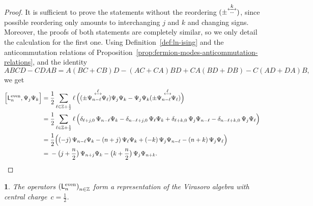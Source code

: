 \documentclass[12pt,oneside,english]{amsart}
\numberwithin{equation}{section}
\numberwithin{figure}{section}
\theoremstyle{plain}
\newtheorem{thm}{\protect\theoremname}
\theoremstyle{plain}
\theoremstyle{plain}
\theoremstyle{plain}
\theoremstyle{remark}
\theoremstyle{definition}
\theoremstyle{plain}
\theoremstyle{plain}
\numberwithin{thm}{section}
\providecommand{\theoremname}{Theorem}
\providecommand{\theoremname}{Theorem}
\providecommand{\theoremname}{Theorem}
\providecommand{\theoremname}{Theorem}
\begin{document}
\begin{proof}
It is sufficient to prove the statements without the reordering
$\ourforder{\cdot}{\cdot}{k}$, since possible reordering only amounts to 
interchanging $j$ and $k$ and changing signs.
Moreover, the proofs of both statements are completely similar, so we only 
detail the calculation for the first one.
Using Definition~\ref{def:ln-ising} and the anticommutation relations
of Proposition~\ref{prop:fermion-modes-anticommutation-relations}, and the 
identity
\[ AB CD - CD AB = A (BC+CB) D - (AC+CA) B D + C A (BD+DB) - C (AD+DA) B , \]
we get
\begin{align*}
\Big[ \virL{n}^{\abbrEven}, \fermmode_{j} \fermmode_{k} \Big]
= \; & \frac{1}{2} \sum_{\ell\in\Z +\frac{1}{2}} 
	\ell \, \Big( \ourforder{\fermmode_{n-\ell}}{\fermmode_{\ell}}{\ell}
				\fermmode_{j} \fermmode_{k}
	    - \fermmode_{j} \fermmode_{k} 	    
			  \ourforder{\fermmode_{n-\ell}}{\fermmode_{\ell}}{\ell} \Big) \\
= \; & \frac{1}{2} \sum_{\ell\in\Z +\frac{1}{2}} 
	\ell \, \Big( \delta_{\ell+j,0} \, \fermmode_{n - \ell} \fermmode_{k} 
	    - \delta_{n-\ell+j,0} \, \fermmode_{\ell} \fermmode_{k}
	    + \delta_{\ell+k,0} \, \fermmode_{j} \fermmode_{n - \ell} 
	    - \delta_{n-\ell+k,0} \, \fermmode_{j} \fermmode_{\ell} \Big) \\
= \; & \frac{1}{2} \Big(
		(-j) \, \fermmode_{n - \ell} \fermmode_{k} 
	    - (n+j) \, \fermmode_{\ell} \fermmode_{k}
	    + (-k) \, \fermmode_{j} \fermmode_{n - \ell} 
	    - (n+k) \, \fermmode_{j} \fermmode_{\ell} \Big) \\
= \; & - \big( j+\frac{n}{2} \big) \, \fermmode_{n+j}\fermmode_{k}
  - \big( k+\frac{n}{2} \big) \, \fermmode_{j}\fermmode_{n+k} .
\end{align*}
\end{proof}
\begin{thm}
\label{thm:ising-ns} The operators
$\left(\mathsf{L}_{n}^{\mathrm{even}}\right)_{n\in\mathbb{Z} }$
form a representation of the Virasoro algebra with central 
charge~${c=\frac{1}{2}}$.
\end{thm}
\end{document}
